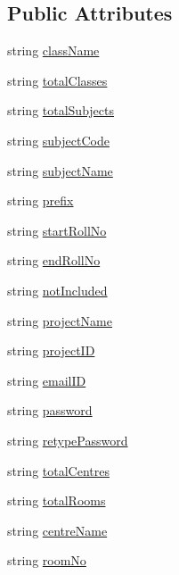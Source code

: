 \subsection*{Public Attributes}
\begin{DoxyCompactItemize}
\item 
string \hyperlink{classInputFieldName_ad8b28ebeabdabb5967542e317f549280}{class\-Name}
\item 
string \hyperlink{classInputFieldName_a5bf413dee6dcf29c1872e93f150d48c0}{total\-Classes}
\item 
string \hyperlink{classInputFieldName_ac58130077f39d82aaf447b1a67e9f70f}{total\-Subjects}
\item 
string \hyperlink{classInputFieldName_af1cc6871c33344c365e6e25ea482bd48}{subject\-Code}
\item 
string \hyperlink{classInputFieldName_a0614731b959afef6bb00f9fc957e7521}{subject\-Name}
\item 
string \hyperlink{classInputFieldName_a161d155f8faca2c5dea1bbd607b17553}{prefix}
\item 
string \hyperlink{classInputFieldName_a24baf5c915b4ee0fb8678e03adec043a}{start\-Roll\-No}
\item 
string \hyperlink{classInputFieldName_a06435f9ba5a529cbba4ee1ce9b02e5cc}{end\-Roll\-No}
\item 
string \hyperlink{classInputFieldName_a9ee6ee84737e1199bdfd9fb24c82c2c7}{not\-Included}
\item 
string \hyperlink{classInputFieldName_ab93b034743570810afe89aea88a7bbf6}{project\-Name}
\item 
string \hyperlink{classInputFieldName_ac4bd117f3137956473f1a1d5ce9106a5}{project\-I\-D}
\item 
string \hyperlink{classInputFieldName_a05541618feaaebe7a3f74b0bf8fa74b9}{email\-I\-D}
\item 
string \hyperlink{classInputFieldName_a318f819ef4663d7e5f40d91180093cb9}{password}
\item 
string \hyperlink{classInputFieldName_acd50095ae8540a735bcd5787b904b06c}{retype\-Password}
\item 
string \hyperlink{classInputFieldName_af88ac102ec3a4adbb9edc7c3d61919cb}{total\-Centres}
\item 
string \hyperlink{classInputFieldName_a51fe8230341d7863ffd4672f2c986beb}{total\-Rooms}
\item 
string \hyperlink{classInputFieldName_a19c67f2d38cde97f856d4ca3639f4fc7}{centre\-Name}
\item 
string \hyperlink{classInputFieldName_abb6b245e03e76aa29d7ef8733298e72f}{room\-No}

\end{DoxyCompactItemize}

